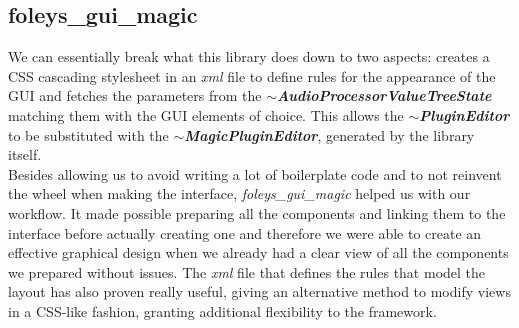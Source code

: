 \documentclass{article}
\begin{document}
\subsection{foleys\_gui\_magic}
We can essentially break what this library does down to two aspects: creates a CSS cascading stylesheet in an \textit{xml} file to define rules for the appearance of the GUI and fetches the parameters from the \textit{\textbf{$\sim$AudioProcessorValueTreeState}} matching them with the GUI elements of choice. This allows the \textit{\textbf{$\sim$PluginEditor}} to be substituted with the \textit{\textbf{$\sim$MagicPluginEditor}}, generated by the library itself.
\\
Besides allowing us to avoid writing a lot of boilerplate code and to not reinvent the wheel when making the interface, \textit{foleys\_gui\_magic} helped us with our workflow. It made possible preparing all the components and linking them to the interface before actually creating one and therefore we were able to create an effective graphical design when we already had a clear view of all the components we prepared without issues. The \textit{xml} file that defines the rules that model the layout has also proven really useful, giving an alternative method to modify views in a CSS-like fashion, granting additional flexibility to the framework.
\end{document}
